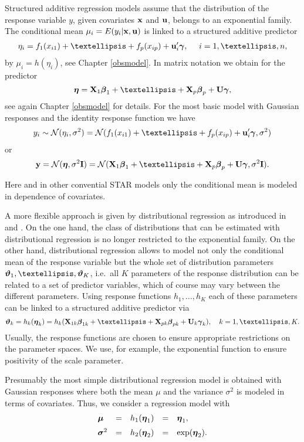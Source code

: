 \documentclass[11pt,a4paper,twoside]{bayesxarticle}
\begin{document}
Structured additive regression models assume that the distribution of the response variable $y$, given covariates $\mathbf{x}$ and $\mathbf{u}$, belongs to an exponential family. The conditional mean $\mu_i = E(y_i|\mathbf{x},\mathbf{u})$ is linked to a structured additive predictor
\begin{align*}
\eta_i = f_1(x_{i1}) + \ldots + f_p(x_{ip}) + \uvec_i' \gammavec, \,\,\,\,\,\,\,\, i = 1, \ldots, n,
\end{align*}
by $\mu_i = h(\eta_i)$, see Chapter \ref{obsmodel}. In matrix notation we obtain for the predictor
$$
\etavec = \Xvec_1 \betavec_1 + \ldots + \Xvec_p \betavec_p + \Uvec \gammavec,
$$
see again Chapter \ref{obsmodel} for details.
For the most basic model with Gaussian responses  and the  identity response function we have
\begin{align*}
y_i \sim  \mathcal{N}(\eta_i, \sigma^2) = \mathcal{N}(f_1(x_{i1}) + \ldots + f_p(x_{ip}) + \uvec_i' \gammavec,\sigma^2)
\end{align*}
or
$$
\yvec = \mathcal{N}(\etavec, \sigma^2 \Ivec) = \mathcal{N}(\Xvec_1 \betavec_1 + \ldots + \Xvec_p \betavec_p + \Uvec \gammavec,\sigma^2 \Ivec).
$$


Here and in other convential STAR models only the conditional mean is modeled in dependence of covariates.

A more flexible approach is given by distributional regression as introduced in   and . On the one hand, the class of distributions that can be estimated with distributional regression is no longer restricted to the exponential family. On the other hand, distributional regression allows to model not only the conditional mean of the response variable but the whole set of distribution parameters $\varthetavec_1,\ldots,\varthetavec_K$, i.e.~all $K$ parameters of the response distribution can be related to a set of predictor variables, which of course may vary between the different parameters. Using response functions $h_1, \ldots, h_K$ each of these parameters can be linked to a structured additive predictor via
\[
\varthetavec_k = h_k(\etavec_k) = h_k(\Xvec_{1k} \betavec_{1k} + \ldots + \Xvec_{pk} \betavec_{pk} + \Uvec_k \gammavec_k), \quad k=1,\ldots,K.
\]
Usually, the response functions are chosen to ensure appropriate restrictions on the parameter spaces. We use, for example, the exponential function to ensure positivity of the scale parameter.

Presumably the most simple distributional regression model is obtained with Gaussian responses where both the mean $\mu$ and the variance
$\sigma^2$ is modeled in terms of covariates.
Thus, we consider a regression model with
\begin{align*}
\begin{array}{lllll}
\boldsymbol{\mu} & = & h_1(\boldsymbol{\eta}_1) & = & \boldsymbol{\eta}_1, \\ [0.2cm]
\mbox{\boldmath $\sigma$}^2 & = & h_2(\boldsymbol{\eta}_2) & = & \exp(\boldsymbol{\eta}_2).
\end{array}
\end{align*}
\end{document}
